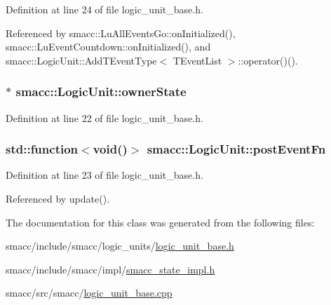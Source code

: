 Definition at line 24 of file logic\+\_\+unit\+\_\+base.\+h.



Referenced by smacc\+::\+Lu\+All\+Events\+Go\+::on\+Initialized(), smacc\+::\+Lu\+Event\+Countdown\+::on\+Initialized(), and smacc\+::\+Logic\+Unit\+::\+Add\+T\+Event\+Type$<$ T\+Event\+List $>$\+::operator()().

\subsubsection[{\texorpdfstring{owner\+State}{ownerState}}]{$\ast$ smacc\+::\+Logic\+Unit\+::owner\+State}\hypertarget{classsmacc_1_1LogicUnit_a8863d227f46868876632b07b500f27d6}{}\label{classsmacc_1_1LogicUnit_a8863d227f46868876632b07b500f27d6}


Definition at line 22 of file logic\+\_\+unit\+\_\+base.\+h.

\subsubsection[{\texorpdfstring{post\+Event\+Fn}{postEventFn}}]{\setlength{\rightskip}{0pt plus 5cm}std\+::function$<$void()$>$ smacc\+::\+Logic\+Unit\+::post\+Event\+Fn}\hypertarget{classsmacc_1_1LogicUnit_ac75aaeeea0e8d3667763a332ecfd65f7}{}\label{classsmacc_1_1LogicUnit_ac75aaeeea0e8d3667763a332ecfd65f7}


Definition at line 23 of file logic\+\_\+unit\+\_\+base.\+h.



Referenced by update().



The documentation for this class was generated from the following files\+:\begin{DoxyCompactItemize}
\item 
smacc/include/smacc/logic\+\_\+units/\hyperlink{logic__unit__base_8h}{logic\+\_\+unit\+\_\+base.\+h}\item 
smacc/include/smacc/impl/\hyperlink{smacc__state__impl_8h}{smacc\+\_\+state\+\_\+impl.\+h}\item 
smacc/src/smacc/\hyperlink{logic__unit__base_8cpp}{logic\+\_\+unit\+\_\+base.\+cpp}\end{DoxyCompactItemize}
